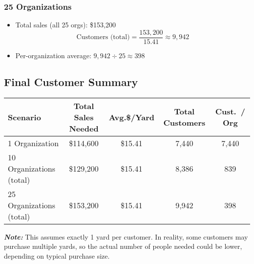 \documentclass[12pt]{article}
\begin{document}
\subsubsection*{25 Organizations}
\begin{itemize}
    \item Total sales (all 25 orgs): \$153{,}200
\[
\text{Customers (total)} 
= \frac{153{,}200}{15.41} 
\approx 9{,}942
\]
\item Per-organization average: \(9{,}942 \div 25 \approx 398\)
\end{itemize}

\subsection*{Final Customer Summary}

\begin{table}[h!]
\centering
\begin{tabular}{lcccc}
\toprule
\textbf{Scenario} & \textbf{Total Sales Needed} & \textbf{Avg.\$/Yard} & \textbf{Total Customers} & \textbf{Cust.\ / Org} \\
\midrule
1 Organization           & \$114,600 & \$15.41 & 7,440 & 7,440 \\
10 Organizations (total) & \$129,200 & \$15.41 & 8,386 & 839   \\
25 Organizations (total) & \$153,200 & \$15.41 & 9,942 & 398   \\
\bottomrule
\end{tabular}
\end{table}

\noindent
\textit{\textbf{Note:}} This assumes exactly 1 yard per customer. In reality, some customers may purchase multiple yards, so the actual number of people needed could be lower, depending on typical purchase size.
\end{document}
